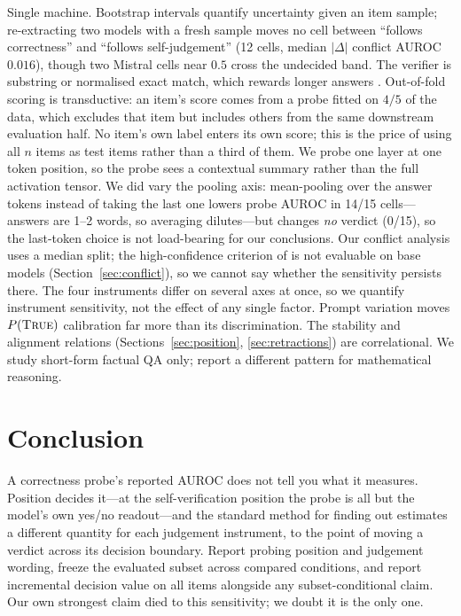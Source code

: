 \documentclass[10pt]{article}
\newcommand{\ptrue}{P(\textsc{True})}
\begin{document}
Single machine. Bootstrap intervals quantify uncertainty given an item sample; re-extracting two
models with a fresh sample moves no cell between ``follows correctness'' and ``follows
self-judgement'' (12 cells, median $|\Delta|$ conflict AUROC $0.016$), though two Mistral cells
near $0.5$ cross the undecided band. The verifier is substring or normalised exact match, which rewards longer answers
\citep{azaria2023internal}. Out-of-fold scoring is transductive: an item's score comes from a probe
fitted on $4/5$ of the data, which excludes that item but includes others from the same downstream
evaluation half. No item's own label enters its own score; this is the price of using all $n$ items
as test items rather than a third of them. We probe one layer at one token position, so the probe
sees a contextual summary rather than the full activation tensor. We did vary the pooling axis:
mean-pooling over the answer tokens instead of taking the last one lowers probe AUROC in 14/15
cells---answers are 1--2 words, so averaging dilutes---but changes \emph{no} verdict (0/15), so the
last-token choice is not load-bearing for our conclusions. Our conflict analysis uses a median split; the high-confidence criterion
of \citet{diagnosing2026} is not evaluable on base models (Section~\ref{sec:conflict}), so we cannot
say whether the sensitivity persists there. The four instruments differ on several axes at once, so
we quantify instrument sensitivity, not the effect of any single factor. Prompt variation moves
$\ptrue{}$ calibration far more than its discrimination. The stability and alignment relations
(Sections~\ref{sec:position}, \ref{sec:retractions}) are correlational. We study short-form factual
QA only; \citet{masked2026} report a different pattern for mathematical reasoning.

\section{Conclusion}

A correctness probe's reported AUROC does not tell you what it measures. Position decides it---at the
self-verification position the probe is all but the model's own yes/no readout---and the standard
method for finding out estimates a different quantity for each judgement instrument, to the point of
moving a verdict across its decision boundary. Report probing position and judgement wording, freeze
the evaluated subset across compared conditions, and report incremental decision value on all items
alongside any subset-conditional claim. Our own strongest claim died to this sensitivity; we doubt
it is the only one.
\end{document}
